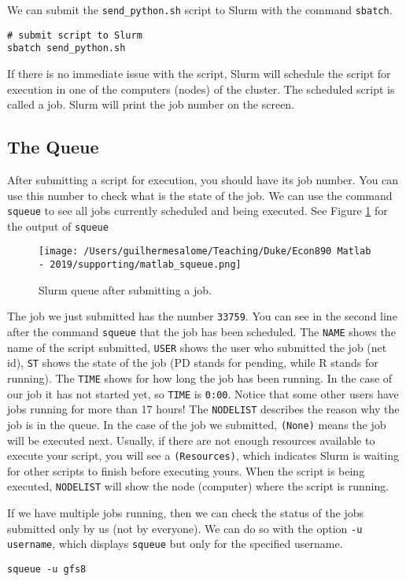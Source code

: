 \documentclass[12pt, a4paper]{article}
\begin{document}
We can submit the \texttt{send\_python.sh} script to Slurm with the command \texttt{sbatch}.
\lstset{language=bash,label= ,caption= ,captionpos=b,firstnumber=1,numbers=left,style=bash}
\begin{lstlisting}
# submit script to Slurm
sbatch send_python.sh
\end{lstlisting}
If there is no immediate issue with the script, Slurm will schedule the script for execution in one of the computers (nodes) of the cluster.
The scheduled script is called a job.
Slurm will print the job number on the screen.
\subsection{The Queue}
\label{sec:orgc648913}
After submitting a script for execution, you should have its job number.
You can use this number to check what is the state of the job.
We can use the command \texttt{squeue} to see all jobs currently scheduled and being executed.
See Figure \ref{fig:org2fd1677} for the output of \texttt{squeue}

\begin{figure}[H]
\centering
\texttt{[image: /Users/guilhermesalome/Teaching/Duke/Econ890 Matlab - 2019/supporting/matlab\_squeue.png]}
\caption{\label{fig:org2fd1677}
Slurm queue after submitting a job.}
\end{figure}

The job we just submitted has the number \texttt{33759}.
You can see in the second line after the command \texttt{squeue} that the job has been scheduled.
The \texttt{NAME} shows the name of the script submitted, \texttt{USER} shows the user who submitted the job (net id), \texttt{ST} shows the state of the job (PD stands for pending, while R stands for running).
The \texttt{TIME} shows for how long the job has been running.
In the case of our job it has not started yet, so \texttt{TIME} is \texttt{0:00}.
Notice that some other users have jobs running for more than 17 hours!
The \texttt{NODELIST} describes the reason why the job is in the queue.
In the case of the job we submitted, \texttt{(None)} means the job will be executed next.
Usually, if there are not enough resources available to execute your script, you will see a \texttt{(Resources)}, which indicates Slurm is waiting for other scripts to finish before executing yours.
When the script is being executed, \texttt{NODELIST} will show the node (computer) where the script is running.

If we have multiple jobs running, then we can check the status of the jobs submitted only by us (not by everyone).
We can do so with the option \texttt{-u username}, which displays \texttt{squeue} but only for the specified username.
\lstset{language=bash,label= ,caption= ,captionpos=b,firstnumber=1,numbers=left,style=bash}
\begin{lstlisting}
squeue -u gfs8
\end{lstlisting}
\end{document}
